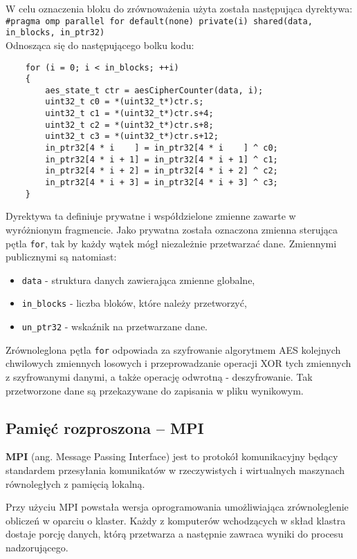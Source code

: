 \documentclass[a4paper,12pt]{article}
\begin{document}
W celu oznaczenia bloku do zrównoważenia użyta została następująca dyrektywa: \\
 \texttt{\#pragma omp parallel for default(none) private(i) shared(data, in\_blocks, in\_ptr32)}\\
Odnosząca się do następującego bolku kodu:\\
\begin{lstlisting}
	for (i = 0; i < in_blocks; ++i)
	{
		aes_state_t ctr = aesCipherCounter(data, i);
		uint32_t c0 = *(uint32_t*)ctr.s;
		uint32_t c1 = *(uint32_t*)ctr.s+4;
		uint32_t c2 = *(uint32_t*)ctr.s+8;
		uint32_t c3 = *(uint32_t*)ctr.s+12;
		in_ptr32[4 * i    ] = in_ptr32[4 * i    ] ^ c0;
		in_ptr32[4 * i + 1] = in_ptr32[4 * i + 1] ^ c1;
		in_ptr32[4 * i + 2] = in_ptr32[4 * i + 2] ^ c2;
		in_ptr32[4 * i + 3] = in_ptr32[4 * i + 3] ^ c3;
	}
\end{lstlisting}

Dyrektywa ta definiuje prywatne i współdzielone zmienne zawarte w wyróżnionym fragmencie. Jako prywatna została oznaczona zmienna sterująca pętla \texttt{for}, tak by każdy wątek mógł niezależnie przetwarzać dane. Zmiennymi publicznymi są natomiast:
\begin{itemize}
\item \texttt{data} - struktura danych zawierająca zmienne globalne,
\item \texttt{in\_blocks} - liczba bloków, które należy przetworzyć,
\item \texttt{un\_ptr32} - wskaźnik na przetwarzane dane.
\end{itemize}

Zrównoleglona pętla  \texttt{for} odpowiada za szyfrowanie algorytmem AES kolejnych chwilowych zmiennych losowych i przeprowadzanie operacji XOR tych zmiennych z szyfrowanymi danymi, a także operację odwrotną - deszyfrowanie. Tak przetworzone dane są przekazywane do zapisania w pliku wynikowym. 

\subsection{Pamięć rozproszona -- MPI}
\textbf{MPI} (ang. Message Passing Interface) jest to protokół komunikacyjny będący standardem przesyłania komunikatów w rzeczywistych i wirtualnych maszynach równoległych z pamięcią lokalną. 

Przy użyciu MPI powstała wersja oprogramowania umożliwiająca zrównoleglenie obliczeń  w oparciu o klaster.  Każdy z komputerów wchodzących w skład klastra dostaje porcję danych, którą przetwarza a następnie zawraca wyniki do procesu nadzorującego.
\end{document}
